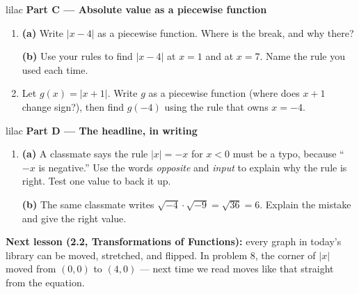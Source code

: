 \documentclass[10pt]{article}
\begin{document}
\vspace{0.06in}

\begin{headlinebox}{lilac}
\textbf{\color{plum}Part C --- Absolute value as a piecewise function}
\end{headlinebox}

\begin{enumerate}[leftmargin=1.9em, itemsep=7pt, start=8]

\item \textbf{(a)} Write $|x - 4|$ as a piecewise function. Where is the break, and why
      there?
      \writespace{1.4cm}{}

      \textbf{(b)} Use your rules to find $|x - 4|$ at $x = 1$ and at $x = 7$. Name the rule
      you used each time.
      \writespace{1.2cm}{}

\item Let $g(x) = |x + 1|$. Write $g$ as a piecewise function (where does $x + 1$ change
      sign?), then find $g(-4)$ using the rule that owns $x = -4$.
      \writespace{2.0cm}{}

\end{enumerate}

\vspace{0.06in}

\begin{headlinebox}{lilac}
\textbf{\color{plum}Part D --- The headline, in writing}
\end{headlinebox}

\begin{enumerate}[leftmargin=1.9em, itemsep=7pt, start=10]

\item \textbf{(a)} A classmate says the rule $|x| = -x$ for $x < 0$ must be a typo, because
      ``$-x$ is negative.'' Use the words \emph{opposite} and \emph{input} to explain why the
      rule is right. Test one value to back it up.
      \writespace{1.6cm}{}

      \textbf{(b)} The same classmate writes $\sqrt{-4}\cdot\sqrt{-9} = \sqrt{36} = 6$. Explain
      the mistake and give the right value.
      \writespace{1.2cm}{}

\end{enumerate}

\boxguard[5]
\begin{spiralbox}
\small
\textbf{Next lesson (2.2, Transformations of Functions):} every graph in today's library can
be moved, stretched, and flipped. In problem 8, the corner of $|x|$ moved from $(0, 0)$ to
$(4, 0)$ --- next time we read moves like that straight from the equation.
\end{spiralbox}
\end{document}
